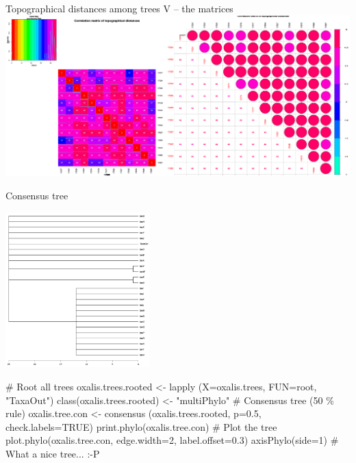 \documentclass[compress, ucs, xelatex, 11pt, xcolor=svgnames,
  hyperref={
    bookmarks=true,
    unicode=true,
    colorlinks=true,
    pdftitle={Molecular data in R},
    plainpages=false,
    pdfauthor={Vojtech Zeisek},
    pdfsubject={Course about phylogeny and evolution in R},
    pdfcreator={XeLaTeX},
    pdfkeywords={R, evolution, phylogeny, molecular data},
    linkcolor=Tomato,
    anchorcolor=SaddleBrown,
    citecolor=Goldenrod,
    filecolor=DarkMagenta,
    menucolor=Sienna,
    urlcolor=DarkTurquoise,
    pdftex},
  url={hyphens, lowtilde} %
  ]{beamer}
\begin{document}
\begin{frame}{Topographical distances among trees V -- the matrices}
\includegraphics[width=\textwidth]{oxalis-dist.png}
\end{frame}

\begin{frame}[fragile]{Consensus tree}
\begin{multicols}{2}
  \includegraphics[height=6cm]{oxalis-cons.png}
  \begin{spluscode}
    # Root all trees
    oxalis.trees.rooted <- lapply
      (X=oxalis.trees, FUN=root,
      "TaxaOut")
    class(oxalis.trees.rooted) <-
      "multiPhylo"
    # Consensus tree (50 \% rule)
    oxalis.tree.con <- consensus
      (oxalis.trees.rooted, p=0.5,
      check.labels=TRUE)
    print.phylo(oxalis.tree.con)
    # Plot the tree
    plot.phylo(oxalis.tree.con,
      edge.width=2, label.offset=0.3)
    axisPhylo(side=1)
    # What a nice tree... :-P
  \end{spluscode}
\end{multicols}
\end{frame}
\end{document}
